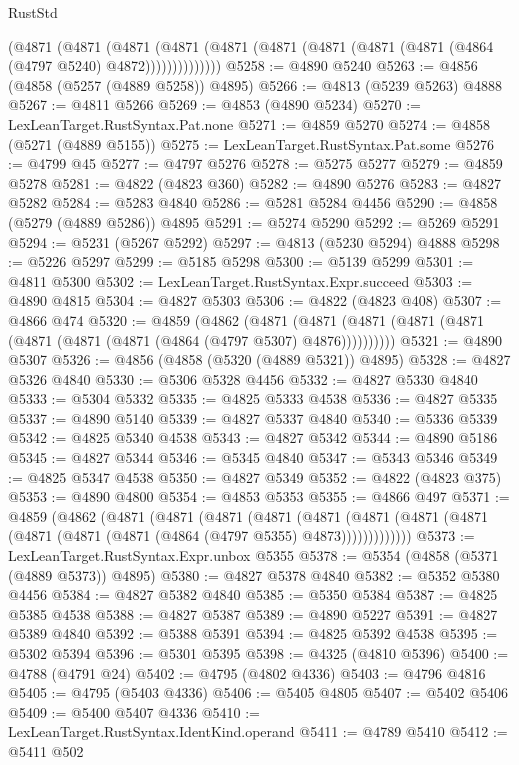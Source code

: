 \begin{lexlean}{RustStd}
\begin{coremodule}
            (@4871
              (@4871
                (@4871
                  (@4871 (@4871 (@4871 (@4871 (@4871 (@4871 (@4864 (@4797 @5240) @4872))))))))))))))
@5258 := @4890 @5240
@5263 := @4856 (@4858 (@5257 (@4889 @5258)) @4895)
@5266 := @4813 (@5239 @5263) @4888
@5267 := @4811 @5266
@5269 := @4853 (@4890 @5234)
@5270 := LexLeanTarget.RustSyntax.Pat.none
@5271 := @4859 @5270
@5274 := @4858 (@5271 (@4889 @5155))
@5275 := LexLeanTarget.RustSyntax.Pat.some
@5276 := @4799 @45
@5277 := @4797 @5276
@5278 := @5275 @5277
@5279 := @4859 @5278
@5281 := @4822 (@4823 @360)
@5282 := @4890 @5276
@5283 := @4827 @5282
@5284 := @5283 @4840
@5286 := @5281 @5284 @4456
@5290 := @4858 (@5279 (@4889 @5286)) @4895
@5291 := @5274 @5290
@5292 := @5269 @5291
@5294 := @5231 (@5267 @5292)
@5297 := @4813 (@5230 @5294) @4888
@5298 := @5226 @5297
@5299 := @5185 @5298
@5300 := @5139 @5299
@5301 := @4811 @5300
@5302 := LexLeanTarget.RustSyntax.Expr.succeed
@5303 := @4890 @4815
@5304 := @4827 @5303
@5306 := @4822 (@4823 @408)
@5307 := @4866 @474
@5320 := @4859
    (@4862
      (@4871 (@4871 (@4871 (@4871 (@4871 (@4871 (@4871 (@4871 (@4864 (@4797 @5307) @4876))))))))))
@5321 := @4890 @5307
@5326 := @4856 (@4858 (@5320 (@4889 @5321)) @4895)
@5328 := @4827 @5326 @4840
@5330 := @5306 @5328 @4456
@5332 := @4827 @5330 @4840
@5333 := @5304 @5332
@5335 := @4825 @5333 @4538
@5336 := @4827 @5335
@5337 := @4890 @5140
@5339 := @4827 @5337 @4840
@5340 := @5336 @5339
@5342 := @4825 @5340 @4538
@5343 := @4827 @5342
@5344 := @4890 @5186
@5345 := @4827 @5344
@5346 := @5345 @4840
@5347 := @5343 @5346
@5349 := @4825 @5347 @4538
@5350 := @4827 @5349
@5352 := @4822 (@4823 @375)
@5353 := @4890 @4800
@5354 := @4853 @5353
@5355 := @4866 @497
@5371 := @4859
    (@4862
      (@4871
        (@4871
          (@4871
            (@4871
              (@4871
                (@4871 (@4871 (@4871 (@4871 (@4871 (@4871 (@4864 (@4797 @5355) @4873)))))))))))))
@5373 := LexLeanTarget.RustSyntax.Expr.unbox @5355
@5378 := @5354 (@4858 (@5371 (@4889 @5373)) @4895)
@5380 := @4827 @5378 @4840
@5382 := @5352 @5380 @4456
@5384 := @4827 @5382 @4840
@5385 := @5350 @5384
@5387 := @4825 @5385 @4538
@5388 := @4827 @5387
@5389 := @4890 @5227
@5391 := @4827 @5389 @4840
@5392 := @5388 @5391
@5394 := @4825 @5392 @4538
@5395 := @5302 @5394
@5396 := @5301 @5395
@5398 := @4325 (@4810 @5396)
@5400 := @4788 (@4791 @24)
@5402 := @4795 (@4802 @4336)
@5403 := @4796 @4816
@5405 := @4795 (@5403 @4336)
@5406 := @5405 @4805
@5407 := @5402 @5406
@5409 := @5400 @5407 @4336
@5410 := LexLeanTarget.RustSyntax.IdentKind.operand
@5411 := @4789 @5410
@5412 := @5411 @502

\end{coremodule}
\end{lexlean}
